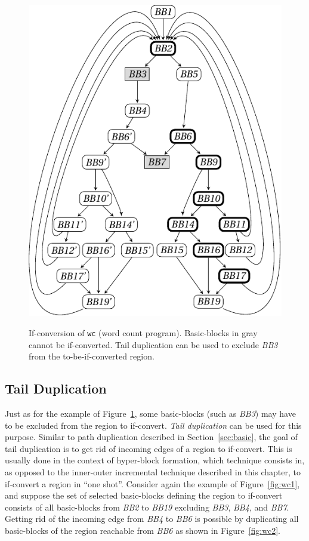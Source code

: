 \begin{figure}
{    \includegraphics[scale=0.7]{graph_c}
    \label{fig:wc3}}
\caption{\label{fig:wc example}If-conversion of \texttt{wc} (word count program). Basic-blocks in gray cannot be if-converted. Tail duplication can be used to exclude \textit{BB3} from the to-be-if-converted region.}
\end{figure}


\subsection{Tail Duplication}

Just as for the example of Figure~\ref{fig:wc example}, some basic-blocks (such as \textit{BB3}) may have to be excluded from the region to if-convert. \emph{Tail duplication} can be used for this purpose. Similar to path duplication described in Section~\ref{sec:basic}, the goal of tail duplication is to get rid of incoming edges of a region to if-convert. This is usually done in the context of hyper-block formation, which technique consists in, as opposed to the inner-outer incremental technique described in this chapter, to if-convert a region in ``one shot''. Consider again the example of Figure~\ref{fig:wc1}, and suppose the set of selected basic-blocks defining the region to if-convert consists of all basic-blocks from \textit{BB2} to \textit{BB19} excluding \textit{BB3}, \textit{BB4}, and \textit{BB7}. Getting rid of the incoming edge from \textit{BB4} to \textit{BB6} is possible by duplicating all basic-blocks of the region reachable from \textit{BB6} as shown in Figure~\ref{fig:wc2}. 

